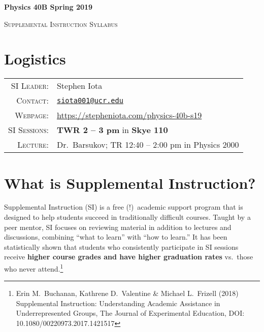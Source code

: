 \documentclass[11pt]{article}
\begin{document}
\begin{center}
\Large\textbf{{Physics 40B Spring 2019}}

\large{\textsc{Supplemental Instruction Syllabus}} 


\end{center}





\section*{Logistics}

\begin{tabular}{rl}

\textsc{SI Leader}:
&
Stephen Iota
\\
\textsc{Contact}:
&
\href{mailto:siota001@ucr.edu}{\texttt{siota001@ucr.edu}}
\\
\textsc{Webpage}:
&
\url{https://stepheniota.com/physics-40b-s19}
\\
\textsc{SI Sessions}:
&
\textbf{TWR 2 -- 3 pm} in \textbf{Skye 110}
\\
\textsc{Lecture:}
&
Dr.~Barsukov; TR 12:40 -- 2:00 pm  in Physics 2000
\\
\end{tabular}







\section*{What is Supplemental Instruction?}

Supplemental Instruction \textsc{(SI)} is a free (!)\ academic support program that is designed to help students succeed in traditionally difficult courses. 
Taught by a peer mentor, SI focuses on reviewing material in addition to lectures and discussions, combining ``what to learn'' with ``how to learn.''
It has been statistically shown that students who consistently participate in SI sessions receive \textbf{higher course grades and have higher graduation rates} vs.~those who never attend.\footnote{Erin M.~Buchanan, Kathrene D.~Valentine \& Michael L.~Frizell (2018) Supplemental Instruction: Understanding Academic Assistance in Underrepresented Groups, The Journal of Experimental Education, DOI: 10.1080/00220973.2017.1421517}
\end{document}

